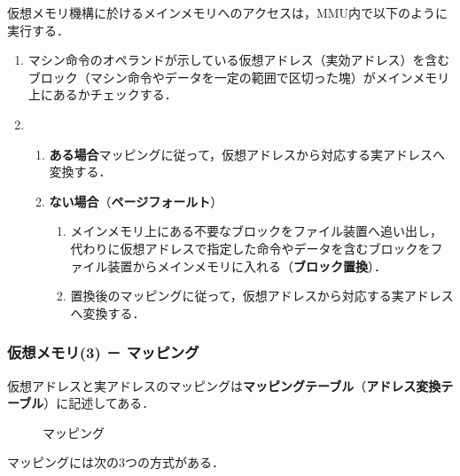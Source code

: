 仮想メモリ機構に於けるメインメモリへのアクセスは，MMU内で以下のように実行する．
\begin{enumerate}[label=\textbf{\arabic*.}, labelsep=10pt, leftmargin=23pt]
	\item マシン命令のオペランドが示している仮想アドレス（実効アドレス）を含むブロック（マシン命令やデータを一定の範囲で区切った塊）がメインメモリ上にあるかチェックする．
	\item 
		\begin{enumerate}[label=\textbf{(\alph*)}, labelsep=10pt, leftmargin=23pt]
			\item \textbf{ある場合}\qquad マッピングに従って，仮想アドレスから対応する実アドレスへ変換する．
			\item \textbf{ない場合}（\textbf{ページフォールト}）
				\begin{enumerate}[label=\textbf{(\arabic*)}, labelsep=10pt, leftmargin=23pt]
					\item メインメモリ上にある不要なブロックをファイル装置へ追い出し，代わりに仮想アドレスで指定した命令やデータを含むブロックをファイル装置からメインメモリに入れる（\textbf{ブロック置換}）．
					\item 置換後のマッピングに従って，仮想アドレスから対応する実アドレスへ変換する．
				\end{enumerate}
		\end{enumerate}
\end{enumerate}



\subsubsection{仮想メモリ(3) － マッピング}\label{sec27-2-D-7}

仮想アドレスと実アドレスのマッピングは\textbf{マッピングテーブル}（\textbf{アドレス変換テーブル}）に記述してある．

\begin{figure}[H]
	\begin{center}
		\caption{マッピング}
		\label{fig27-7}
	\end{center}
\end{figure}

マッピングには次の3つの方式がある．

